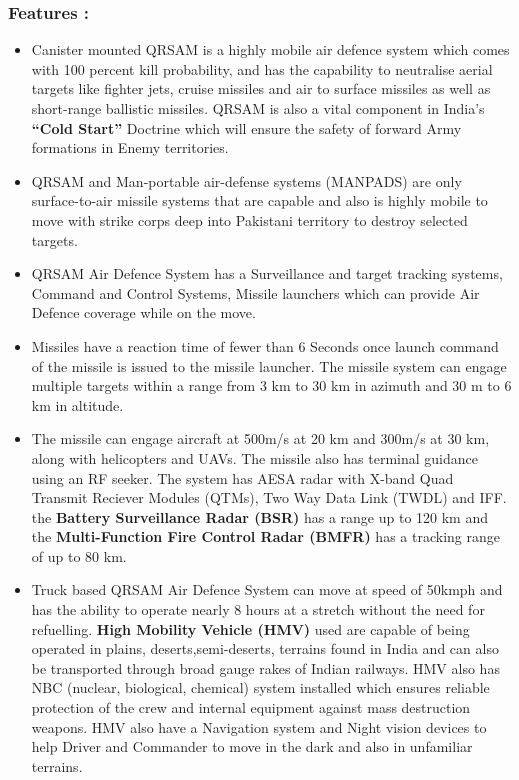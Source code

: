 \documentclass[14pt]{article} %
\begin{document}
\subsubsection{Features :}
\begin{itemize}
\item[] Canister mounted QRSAM is a highly mobile air defence system which comes with 100 percent kill probability, and has the capability to neutralise aerial targets like fighter jets, cruise missiles and air ­to ­surface missiles as well as short-range ballistic missiles. QRSAM is also a vital component in India’s \textbf{“Cold Start”} Doctrine which will ensure the safety of forward Army formations in Enemy territories.
\item[] QRSAM and Man-portable air-defense systems (MANPADS) are only surface-to-air missile systems that are capable and also is highly mobile to move with strike corps deep into Pakistani territory to destroy selected targets.
\item[] QRSAM Air Defence System has a Surveillance and target tracking systems, Command and Control Systems, Missile launchers which can provide Air Defence coverage while on the move. 
\item[] Missiles have a reaction time of fewer than 6 Seconds once launch command of the missile is issued to the missile launcher. The missile system can engage multiple targets within a range from 3 km to 30 km in azimuth and 30 m to 6 km in altitude.
\item[] The missile can engage aircraft at 500m/s at 20 km and 300m/s at 30 km, along with helicopters and UAVs. The missile also has terminal guidance using an RF seeker. The system has AESA radar with X-band Quad Transmit Reciever Modules (QTMs), Two Way Data Link (TWDL) and IFF. the \textbf{Battery Surveillance Radar (BSR)} has a range up to 120 km and the\textbf{ Multi-Function Fire Control Radar (BMFR)} has a tracking range of up to 80 km. 
\item[] Truck based QRSAM Air Defence System can move at speed of 50kmph and has the ability to operate nearly 8 hours at a stretch without the need for refuelling. \textbf{High Mobility Vehicle (HMV)} used are capable of being operated in plains, deserts,semi-deserts, terrains found in India and can also be transported through broad gauge rakes of Indian railways. HMV also has NBC (nuclear, biological, chemical) system installed which ensures reliable protection of the crew and internal equipment against mass destruction weapons. HMV also have a Navigation system and Night vision devices to help Driver and Commander to move in the dark and also in unfamiliar terrains.

\end{itemize}
\end{document}
